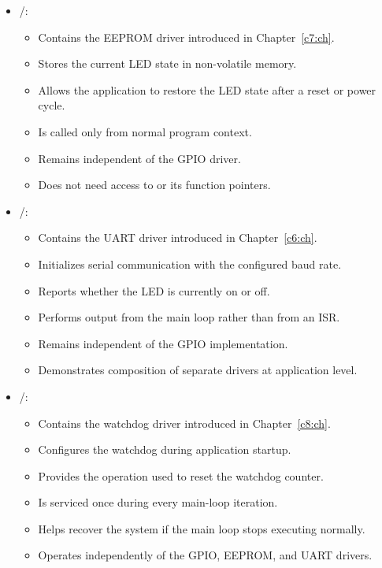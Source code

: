 \begin{itemize}
\begin{itemize}
  \end{itemize}
  \item {}/:
  \begin{itemize}
    \item Contains the EEPROM driver introduced in Chapter~\ref{c7:ch}.
    \item Stores the current LED state in non-volatile memory.
    \item Allows the application to restore the LED state after a reset or power cycle.
    \item Is called only from normal program context.
    \item Remains independent of the GPIO driver.
    \item Does not need access to  or its function pointers.
  \end{itemize}
  \item {}/:
  \begin{itemize}
    \item Contains the UART driver introduced in Chapter~\ref{c6:ch}.
    \item Initializes serial communication with the configured baud rate.
    \item Reports whether the LED is currently on or off.
    \item Performs output from the main loop rather than from an ISR.
    \item Remains independent of the GPIO implementation.
    \item Demonstrates composition of separate drivers at application level.
  \end{itemize}
  \item {}/:
  \begin{itemize}
    \item Contains the watchdog driver introduced in Chapter~\ref{c8:ch}.
    \item Configures the watchdog during application startup.
    \item Provides the operation used to reset the watchdog counter.
    \item Is serviced once during every main-loop iteration.
    \item Helps recover the system if the main loop stops executing normally.
    \item Operates independently of the GPIO, EEPROM, and UART drivers.
  \end{itemize}

\end{itemize}
